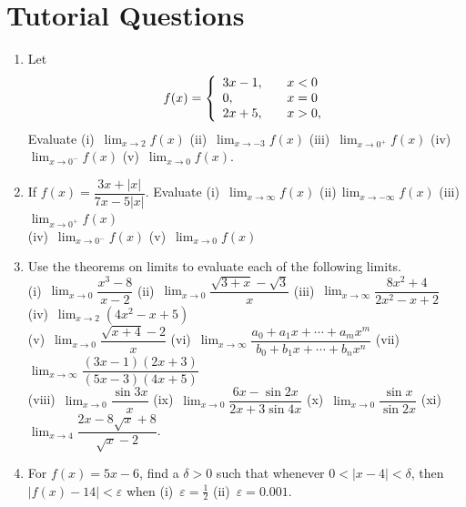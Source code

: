 \documentclass[titlepage,a4paper,12pt]{report}
\begin{document}
\section{Tutorial Questions}
\begin{enumerate}
\item Let \[f(x) = \left\{ 
\begin{array}{l l}
  3x-1, & \quad x< 0\\
  0, & \quad x=0\\
  2x+5, & \quad x >0,\\ \end{array} \right. \]
  Evaluate (i)\, $\displaystyle \lim _{x\rightarrow 2}f(x) $ \quad (ii)\, $\displaystyle \lim _{x\rightarrow -3}f(x)$ \quad (iii)\, $\displaystyle \lim _{x\rightarrow 0^+}f(x)$ \quad (iv)\, $\displaystyle \lim _{x\rightarrow 0^-}f(x)$ \quad (v)\, $\displaystyle \lim _{x\rightarrow 0}f(x)$.
  \item If $f(x)=\dfrac{3x+|x|}{7x-5|x|}$. Evaluate (i)\, $\displaystyle \lim _{x\rightarrow \infty}f(x)$ \quad (ii)\,$\displaystyle \lim _{x\rightarrow -\infty}f(x)$ \quad (iii)\, $\displaystyle \lim _{x\rightarrow 0^+}f(x)$ \\
   (iv)\, $\displaystyle \lim _{x\rightarrow 0^-}f(x)$ \quad (v)\, $\displaystyle \lim _{x\rightarrow 0}f(x)$
\item Use the theorems on limits to evaluate each of the following limits.\\
(i)\, $\displaystyle \lim _{x\rightarrow 0}\dfrac{x^3-8}{x-2}$ \quad (ii)\, $\displaystyle \lim _{x\rightarrow 0}{\dfrac{\sqrt{3+x}-\sqrt{3}}{{x}}}$  \quad (iii)\, $\displaystyle \lim _{x\rightarrow \infty}{\dfrac{8x^2+4}{2x^2-x+2}}$ \quad (iv)\, $\displaystyle \lim _{x\rightarrow 2}{(4x^2-x+5)}$\\
(v)\, $\displaystyle \lim _{x \rightarrow 0}{\dfrac{\sqrt{x+4}-2}{x}}$ \quad (vi)\, $\displaystyle \lim _{x\rightarrow \infty}{\dfrac{a_0+a_1x+\cdots +a_mx^m}{b_0+b_1x+\cdots +b_nx^n}}$ \quad (vii)\, $\displaystyle \lim _{x\rightarrow \infty}{\dfrac{(3x-1)(2x+3)}{(5x-3)(4x+5)}}$\\
(viii)\, $\displaystyle \lim _{x\rightarrow  0}{\dfrac{\sin 3x}{x}}$ \quad (ix)\, $\displaystyle \lim _{x\rightarrow 0}{\dfrac{6x-\sin 2x}{2x+3\sin 4x}}$ \quad (x)\, $\displaystyle \lim _{x\rightarrow 0}{\dfrac{\sin x}{\sin 2x}}$ \quad (xi)\, $\displaystyle \lim _{x\rightarrow 4}{\dfrac{2x-8\sqrt{x}+8}{\sqrt{x}-2}}$.
\item For $f(x)=5x-6$, find a $\delta >0$ such that  whenever $0<|x-4|<\delta$, then $|f(x)-14|<\varepsilon$ when (i)\, $\varepsilon =\frac{1}{2}$ \quad (ii)\, $\varepsilon =0.001$.

\end{enumerate}
\end{document}
